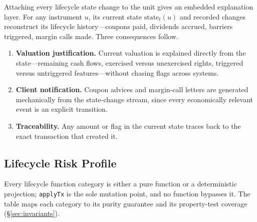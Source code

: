 Attaching every lifecycle state change to the unit gives an embedded explanation layer. For any instrument $u$, its current state $\text{state}_t(u)$ and recorded changes reconstruct its lifecycle history---coupons paid, dividends accrued, barriers triggered, margin calls made. Three consequences follow.

\begin{enumerate}[nosep]
\item \textbf{Valuation justification.} Current valuation is explained directly from the state---remaining cash flows, exercised versus unexercised rights, triggered versus untriggered features---without chasing flags across systems.
\item \textbf{Client notification.} Coupon advices and margin-call letters are generated mechanically from the state-change stream, since every economically relevant event is an explicit transition.
\item \textbf{Traceability.} Any amount or flag in the current state traces back to the exact transaction that created it.
\end{enumerate}

\subsection{Lifecycle Risk Profile}
\label{sec:risk-profile}

Every lifecycle function category is either a pure function or a deterministic projection; \texttt{applyTx} is the sole mutation point, and no function bypasses it. The table maps each category to its purity guarantee and its property-test coverage (\S\ref{sec:invariants}).

